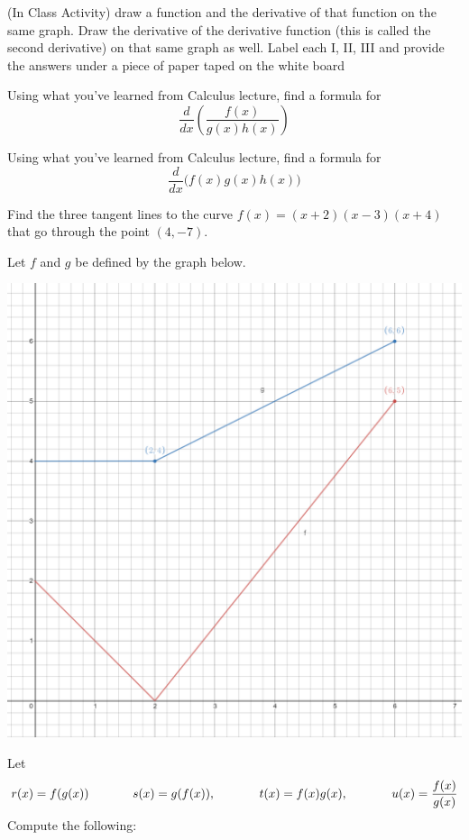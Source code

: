 \documentclass[11pt]{exam}
\begin{document}
	\begin{questions}
		
		\addpoints
		
		\question[0] (In Class Activity) draw a function and the derivative of that function on the same graph.  Draw the derivative of the derivative function (this is called the second derivative) on that same graph as well.  Label each I, II, III and provide the answers under a piece of paper taped on the white board
		
		\question[5] Using what you've learned from Calculus lecture, find a formula for
		\[
		\frac{d}{d x} \left( \frac{f(x)}{g(x)h(x)} \right)
		\]
		
			\question[5] Using what you've learned from Calculus lecture, find a formula for
		\[
		\frac{d}{d x} \Big( f(x)g(x)h(x) \Big)
		\]
		
		\question[5] Find the three tangent lines to the curve $f(x)=(x+2)(x-3)(x+4)$ that go through the point $(4,-7)$.
		
		\newpage
		
		\question[10] Let $f$ and $g$ be defined by the graph below.
		
		\includegraphics[width = 5 in]{images/desmos-lab-5.png}
		
		Let
		\[
		r(x) = f(g(x)) \hspace{.5 in} s(x) = g(f(x)), \hspace{.5 in} t(x) = f(x)g(x), \hspace{.5 in} u(x) = \frac{f(x)}{g(x)}
		\]
		Compute the following:
		\begin{multicols}{2}
			\begin{parts}

\end{parts}
\end{multicols}
\end{questions}
\end{document}
